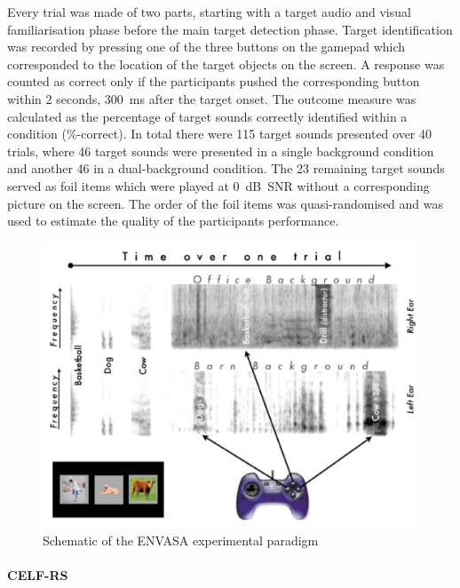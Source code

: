 \documentclass[a4paper, twoside]{templates/ociamthesis}
\begin{document}
Every trial was made of two parts, starting with a target audio and visual familiarisation phase before the main target detection phase. Target identification was recorded by pressing one of the three buttons on the gamepad which corresponded to the location of the target objects on the screen. A response was counted as correct only if the participants pushed the corresponding button within 2 seconds, 300~ms after the target onset. The outcome measure was calculated as the percentage of target sounds correctly identified within a condition (\%-correct). In total there were 115 target sounds presented over 40 trials, where 46 target sounds were presented in a single background condition and another 46 in a dual-background condition. The 23 remaining target sounds served as foil items which were played at 0~dB~SNR without a corresponding picture on the screen. The order of the foil items was quasi-randomised and was used to estimate the quality of the participants performance.\\



\begin{figure}

{\centering \includegraphics[width=0.75\linewidth]{figures/ENVASAparadigm} 

}

\caption{Schematic of the ENVASA experimental paradigm \autocite[taken from][]{Leech2009}}\label{fig:ENVASA}
\end{figure}

\hypertarget{celf-rs}{%
\paragraph{CELF-RS}\label{celf-rs}}
\end{document}
